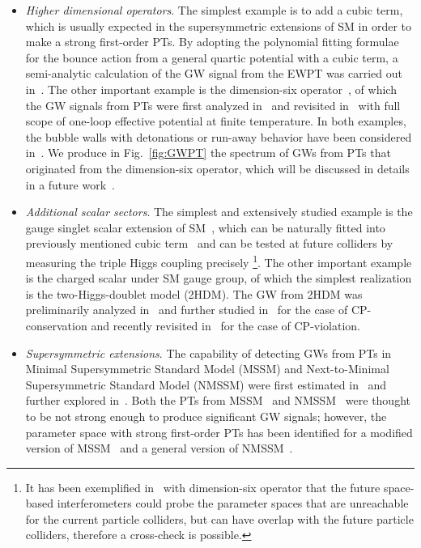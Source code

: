 \documentclass[a4paper,11pt]{article}
\begin{document}
\begin{itemize}
  \item \textit{Higher dimensional operators}. The simplest example is to add a cubic term, which is usually expected in the supersymmetric extensions of SM in order to make a strong first-order PTs. By adopting the polynomial fitting formulae~\cite{Adams:1993zs} for the bounce action from a general quartic potential with a cubic term, a semi-analytic calculation of the GW signal from the EWPT was carried out in~\cite{Kehayias:2009tn}. The other important example is the dimension-six operator~\cite{Grojean:2004xa,Bodeker:2004ws}, of which the GW signals from PTs were first analyzed in~\cite{Huber:2007vva} and revisited in~\cite{Delaunay:2007wb} with full scope of one-loop effective potential at finite temperature. In both examples, the bubble walls with detonations or run-away behavior have been considered in~\cite{Leitao:2015fmj}. We produce in  Fig.~\ref{fig:GWPT} the spectrum of GWs from PTs that originated from the dimension-six operator, which will be discussed in details in a future work~\cite{wang:future}.
  \item \textit{Additional scalar sectors}. The simplest and extensively studied example is the gauge singlet scalar extension of SM~\cite{Leitao:2012tx,Jinno:2015doa,Hashino:2016rvx,Huang:2016cjm,Hashino:2016xoj,Balazs:2016tbi,Vaskonen:2016yiu,Beniwal:2017eik}, which can be naturally fitted into previously mentioned cubic term~\cite{Kehayias:2009tn} and can be tested at future colliders by measuring the triple Higgs coupling precisely \footnote{It has been exemplified in~\cite{Huang:2016odd} with dimension-six operator that the future space-based interferometers could probe the parameter spaces that are unreachable for the current particle colliders, but can have overlap with the future particle colliders, therefore a cross-check is possible.}. The other important example is the charged scalar under SM gauge group, of which the simplest realization is the two-Higgs-doublet model (2HDM). The GW from 2HDM was preliminarily analyzed in~\cite{Kakizaki:2015wua} and further studied in~\cite{Caprini:2015zlo} for the case of CP-conservation and recently revisited in~\cite{Dorsch:2016nrg} for the case of CP-violation.
  \item \textit{Supersymmetric extensions}. The capability of detecting GWs from PTs in Minimal Supersymmetric Standard Model (MSSM) and Next-to-Minimal Supersymmetric Standard Model (NMSSM) were first estimated in~\cite{Apreda:2001tj} and further explored in~\cite{Apreda:2001us}. Both the PTs from MSSM~\cite{Leitao:2012tx} and NMSSM~\cite{Huber:2007vva} were thought to be not strong enough to produce significant GW signals; however, the parameter space with strong first-order PTs has been identified for a modified version of MSSM~\cite{Garcia-Pepin:2016hvs} and a general version of NMSSM~\cite{Huber:2015znp}.

\end{itemize}
\end{document}
